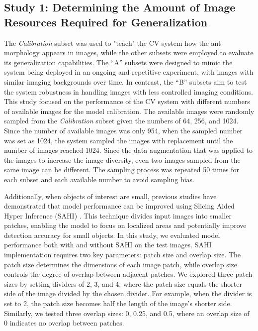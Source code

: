 \subsection{Study 1: Determining the Amount of Image Resources Required for Generalization}

The \textit{Calibration} subset was used to "teach" the CV system how the ant morphology appears in images, while the other subsets were employed to evaluate its generalization capabilities. The “A” subsets were designed to mimic the system being deployed in an ongoing and repetitive experiment, with images with similar imaging backgrounds over time. In contrast, the “B” subsets aim to test the system robustness in handling images with less controlled imaging conditions. This study focused on the performance of the CV system with different numbers of available images for the model calibration. The available images were randomly sampled from the \textit{Calibration} subset given the numbers of 64, 256, and 1024. Since the number of available images was only 954, when the sampled number was set as 1024, the system sampled the images with replacement until the number of images reached 1024. Since the data augmentation that was applied to the images to increase the image diversity, even two images sampled from the same image can be different. The sampling process was repeated 50 times for each subset and each available number to avoid sampling bias. 

Additionally, when objects of interest are small, previous studies have demonstrated that model performance can be improved using Slicing Aided Hyper Inference (SAHI) \cite{akyon_slicing_2022}. This technique divides input images into smaller patches, enabling the model to focus on localized areas and potentially improve detection accuracy for small objects. In this study, we evaluated model performance both with and without SAHI on the test images. SAHI implementation requires two key parameters: patch size and overlap size. The patch size determines the dimensions of each image patch, while overlap size controls the degree of overlap between adjacent patches. We explored three patch sizes by setting dividers of 2, 3, and 4, where the patch size equals the shorter side of the image divided by the chosen divider. For example, when the divider is set to 2, the patch size becomes half the length of the image's shorter side. Similarly, we tested three overlap sizes: 0, 0.25, and 0.5, where an overlap size of 0 indicates no overlap between patches.

